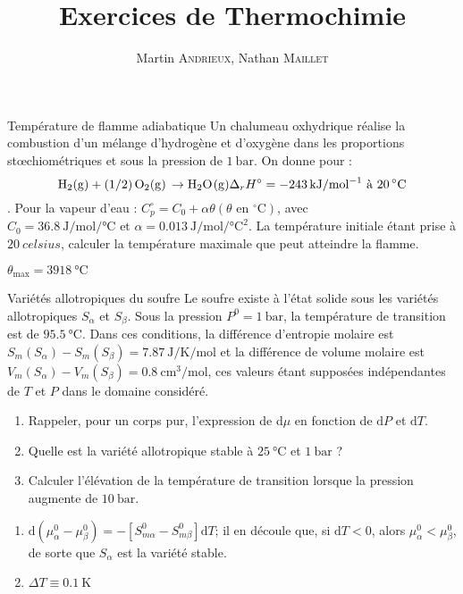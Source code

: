 \documentclass[french, a4paper, 11pt]{article}
\title{Exercices de Thermochimie}
\author{Martin \textsc{Andrieux}, Nathan \textsc{Maillet}}
\date{}
\begin{document}
\maketitle

\begin{cadre}{Température de flamme adiabatique}
  Un chalumeau oxhydrique réalise la combustion d'un mélange d'hydrogène et d'oxygène dans les
  proportions st\oe{}chiométriques et sous la pression de \(\SI{1}{\bar}\). On donne pour :
    \[\ce{H2(g) + (1/2)O2(g) \rightarrow H2O(g)} \Delta_rH^{\circ}=\SI{-243}{\kilo\joule\per\mole^{-1}} \text{ à } \SI{20}{\celsius}\].
  Pour la vapeur d'eau : \(C_p^{\circ}=C_0+\alpha \theta (\theta \text{ en } ^{\circ} \text{C})\), avec \(C_0=\SI{36.8}{\joule\per\mole\per\celsius} \text{ et }
  \alpha=\SI{0.013}{\joule\per\mole\per\celsius\squared}.\) La température initiale étant prise à \(\SI{20}{celsius}\), calculer la température maximale que peut atteindre la flamme.
  
  \tcblower
  \(\theta_{\text{max}}=\SI{3 918}{\celsius}\)
\end{cadre}

\begin{cadre}{Variétés allotropiques du soufre}
  Le soufre existe à l'état solide sous les variétés allotropiques \(S_{\alpha}\) et \(S_{\beta}\). Sous la pression \(P^0=\SI{1}{\bar}\),
  la température de transition est de \(\SI{95.5}{\celsius}\). Dans ces conditions, la différence d'entropie molaire est
  \({S_m(S_{\alpha})-S_m(S_{\beta})=\SI{7.87}{\joule\per\kelvin\per\mole}}\) et la différence de volume molaire est
  \({V_m(S_{\alpha})-V_m(S_{\beta})=\SI{0.8}{\centi\metre\cubed\per\mole}}\), ces valeurs étant supposées indépendantes de \(T\) et \(P\) dans le domaine considéré.
  \begin{enumerate}
    \item Rappeler, pour un corps pur, l'expression de d$\mu$ en fonction de $\mathrm{d}P$ et $\mathrm{d}T$.
    \item Quelle est la variété allotropique stable à \(\SI{25}{\celsius}\) et \(\SI{1}{\bar}\) ?
    \item Calculer l'élévation de la température de transition lorsque la pression augmente de \(\SI{10}{\bar}\).
  \end{enumerate}
  
  \tcblower
  \begin{enumerate}
    \item \(\mathrm{d}(\mu_{\alpha}^0-\mu_{\beta}^0)=-[S_{m\alpha}^0-S_{m\beta}^0]\mathrm{d}T\); il en découle que,
    si \(\mathrm{d}T < 0\), alors \(\mu_{\alpha}^0<\mu_{\beta}^0\), de sorte que \(S_{\alpha}\) est la variété stable.
    \item \(\Delta T \equiv \SI{0.1}{\kelvin}\)
  \end{enumerate}    
\end{cadre}
\end{document}
